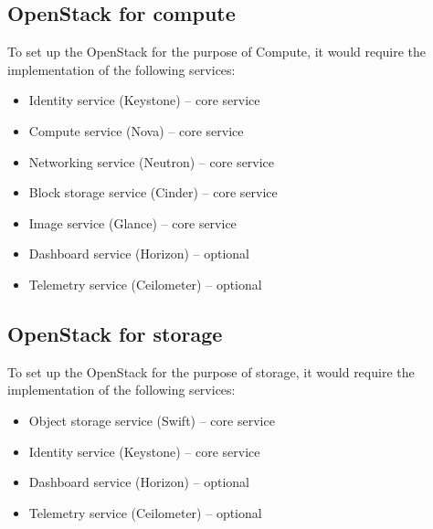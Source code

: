 \subsection{OpenStack for compute}\label{ssec:openstackforcompute}
To set up the OpenStack for the purpose of Compute, it would require the implementation of the following services:
\begin{itemize}
  \item Identity service (Keystone) -- core service
  \item Compute service (Nova) -- core service
  \item Networking service (Neutron) -- core service
  \item Block storage service (Cinder) -- core service
  \item Image service (Glance) -- core service
  \item Dashboard service (Horizon) -- optional
  \item Telemetry service (Ceilometer) -- optional
\end{itemize}

\subsection{OpenStack for storage}\label{ssec:openstackforstorage}
To set up the OpenStack for the purpose of storage, it would require the implementation of the following services:
\begin{itemize}
  \item Object storage service (Swift) -- core service
  \item Identity service (Keystone) -- core service
  \item Dashboard service (Horizon) -- optional
  \item Telemetry service (Ceilometer) -- optional
\end{itemize}


